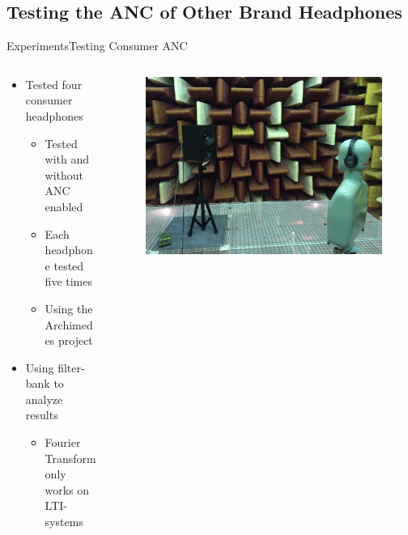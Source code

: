 \subsection{Testing the ANC of Other Brand Headphones}
\begin{frame}{Experiments}{Testing Consumer ANC}		
	\begin{columns}
		\begin{column}{0.5\textwidth}
			\begin{itemize}
				\item Tested four consumer headphones
					\begin{itemize}
						\item Tested with and without ANC enabled
						\item Each headphone tested five times
						\item Using the Archimedes project
					\end{itemize}
				\item Using filter-bank to analyze results
				\begin{itemize}
					\item Fourier Transform only works on LTI-systems
				\end{itemize}
			\end{itemize}
		\end{column}
		\begin{column}{0.5\textwidth} 				
			\begin{figure}[h]
				\includegraphics[width=1\textwidth]{figures/OtherBrandsSetupSide.jpg}
			\end{figure}
		\end{column}
	\end{columns}
\end{frame}










